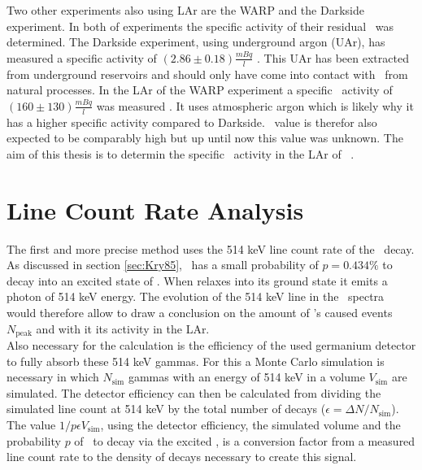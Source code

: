 \documentclass[encoding=utf8,british]{tumphthesis}
\begin{document}

Two other experiments also using LAr are the WARP and the Darkside experiment.
In both of experiments the specific activity of their residual \Kr\ was determined.
The Darkside experiment, using underground argon (UAr), has measured a specific activity of \((2.86\pm0.18) \frac{\unit{mBq}} {\unit{l}}\)  \cite{agnes_results_2016}.
This UAr has been extracted from underground reservoirs and should only have come into contact with \Kr\ from natural processes.
In the LAr of the WARP experiment a specific \Kr\ activity of   \((160\pm130)\frac{\unit{mBq}}{\unit{l}}\) was measured \cite{benetti_measurement_2006}.
It uses atmospheric argon which is likely why it has a higher specific activity compared to  Darkside.
\gerdas\ value is therefor also expected to be comparably high but up until now this value was unknown.
The aim of this thesis is to determin the specific \Kr\ activity in the LAr of \gerda\ \PII.

 
\chapter{Line Count Rate Analysis}
\label{sec:SAfrom514}

The first and more precise method uses the 514 keV line count rate of the \Kr\ decay.
As discussed in section \ref{sec:Kry85}, \Kr\ has a small probability of $p=0.434\%$ to decay into an excited state of . 
When  relaxes into its ground state it emits a photon of 514 keV energy.
The evolution of the 514 keV line in the \gerda\ spectra would therefore allow to draw a conclusion on the amount of \Kr's caused events $N_{\mathrm{peak}}$ and with it its activity in the LAr. 
\\

Also necessary for the calculation is the efficiency of the used germanium detector to fully absorb these 514 keV gammas.
For this a Monte Carlo simulation is necessary in which $N_{\mathrm{sim}}$ gammas with an energy of 514 keV  in a  volume $V_{\mathrm{sim}}$ are simulated.
The detector efficiency can then be calculated from dividing the simulated line count at 514 keV by the total number of  decays ($\epsilon = \Delta N/N_{\mathrm{sim}}$).
The value $1/p \epsilon V_{\mathrm{sim}}$, using the detector efficiency, the simulated volume and the probability $p$ of \Kr\ to decay via the excited , is a conversion factor from a measured line count rate to the density of decays necessary to create this signal.
\\
\end{document}
